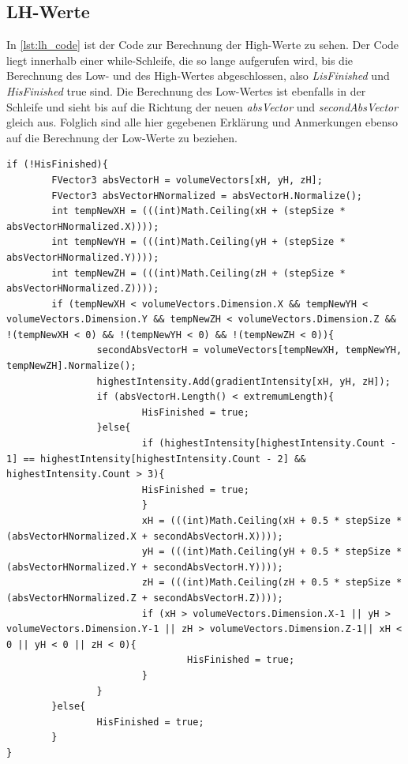 \subsection{LH-Werte}

In \autoref{lst:lh_code} ist der Code zur Berechnung der High-Werte zu sehen. Der Code liegt innerhalb einer while-Schleife, die so lange aufgerufen wird, bis die Berechnung des Low- und des High-Wertes abgeschlossen, also \textit{LisFinished} und \textit{HisFinished} true sind.
\newline
Die Berechnung des Low-Wertes ist ebenfalls in der Schleife und sieht bis auf die Richtung der neuen \textit{absVector} und \textit{secondAbsVector} gleich aus. Folglich sind alle hier gegebenen Erklärung und Anmerkungen ebenso auf die Berechnung der Low-Werte zu beziehen.




\begin{lstlisting}[caption = Code zur Berechnung der High-Werte, label = lst:lh_code]
if (!HisFinished){
		FVector3 absVectorH = volumeVectors[xH, yH, zH];
		FVector3 absVectorHNormalized = absVectorH.Normalize();
		int tempNewXH = (((int)Math.Ceiling(xH + (stepSize * absVectorHNormalized.X))));
		int tempNewYH = (((int)Math.Ceiling(yH + (stepSize * absVectorHNormalized.Y))));
		int tempNewZH = (((int)Math.Ceiling(zH + (stepSize * absVectorHNormalized.Z))));
		if (tempNewXH < volumeVectors.Dimension.X && tempNewYH < volumeVectors.Dimension.Y && tempNewZH < volumeVectors.Dimension.Z && !(tempNewXH < 0) && !(tempNewYH < 0) && !(tempNewZH < 0)){
				secondAbsVectorH = volumeVectors[tempNewXH, tempNewYH, tempNewZH].Normalize();
				highestIntensity.Add(gradientIntensity[xH, yH, zH]);
				if (absVectorH.Length() < extremumLength){
						HisFinished = true;
				}else{
						if (highestIntensity[highestIntensity.Count - 1] == highestIntensity[highestIntensity.Count - 2] && highestIntensity.Count > 3){
						HisFinished = true;
						}
						xH = (((int)Math.Ceiling(xH + 0.5 * stepSize * (absVectorHNormalized.X + secondAbsVectorH.X))));
						yH = (((int)Math.Ceiling(yH + 0.5 * stepSize * (absVectorHNormalized.Y + secondAbsVectorH.Y))));
						zH = (((int)Math.Ceiling(zH + 0.5 * stepSize * (absVectorHNormalized.Z + secondAbsVectorH.Z))));
						if (xH > volumeVectors.Dimension.X-1 || yH > volumeVectors.Dimension.Y-1 || zH > volumeVectors.Dimension.Z-1|| xH < 0 || yH < 0 || zH < 0){
								HisFinished = true;
						}
				}
		}else{
				HisFinished = true;
		}
}
\end{lstlisting}


